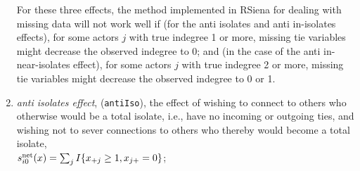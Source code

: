 \documentclass[a4paper,fleqn,11pt]{article}
\newcommand{\+}{\, + \,}
\newcommand{\rs}{{\sf RSiena}}
\newcommand{\RS}{{\sf \textsf{RSiena} }}
\newcommand{\vit}{\theenumi}
\newcounter{savenumi}
\begin{document}
\begin{enumerate}
For these three effects, the method implemented in \RS for dealing with
missing data will not work well if
(for the anti isolates and anti in-isolates effects),
for some actors $j$ with true indegree 1 or more, missing tie variables
might decrease the observed indegree to 0;
and (in the case of the anti in-near-isolates effect),
for some actors $j$ with true indegree 2 or more, missing tie variables
might decrease the observed indegree to 0 or 1.
\fi

\item \emph{anti isolates effect}, (\texttt{antiIso}), the effect of
      wishing to connect to others who otherwise would
      be a total isolate, i.e., have no incoming or outgoing
      ties, and wishing not to sever connections to
      others who thereby would become a total isolate,\\
$s^{\rm net}_{i\vit}(x) = \sum_j I\{x_{+j} \geq 1, x_{j+} = 0\} $;\\



\end{enumerate}
\end{document}
